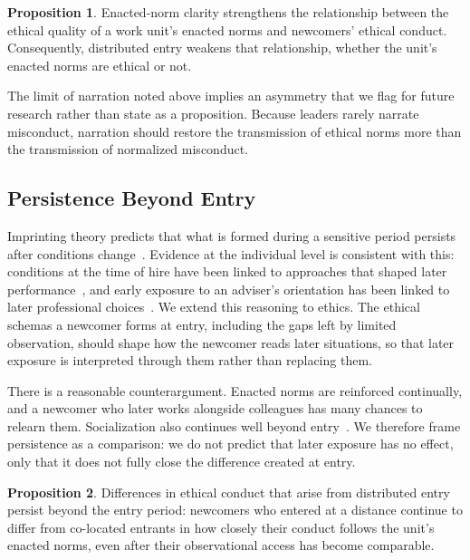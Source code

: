 \documentclass[12pt,a4paper]{article}
\theoremstyle{definition}
\newtheorem{proposition}{Proposition}
\begin{document}
\begin{proposition}
Enacted-norm clarity strengthens the relationship between the ethical quality of a work unit's enacted norms and newcomers' ethical conduct. Consequently, distributed entry weakens that relationship, whether the unit's enacted norms are ethical or not.
\end{proposition}

The limit of narration noted above implies an asymmetry that we flag for future research rather than state as a proposition. Because leaders rarely narrate misconduct, narration should restore the transmission of ethical norms more than the transmission of normalized misconduct.

\subsection{Persistence Beyond Entry}

Imprinting theory predicts that what is formed during a sensitive period persists after conditions change~\citep{marquis2013imprinting}. Evidence at the individual level is consistent with this: conditions at the time of hire have been linked to approaches that shaped later performance~\citep{tilcsik2014imprint}, and early exposure to an adviser's orientation has been linked to later professional choices~\citep{azoulay2017social}. We extend this reasoning to ethics. The ethical schemas a newcomer forms at entry, including the gaps left by limited observation, should shape how the newcomer reads later situations, so that later exposure is interpreted through them rather than replacing them.

There is a reasonable counterargument. Enacted norms are reinforced continually, and a newcomer who later works alongside colleagues has many chances to relearn them. Socialization also continues well beyond entry~\citep{vanmaanen1979toward}. We therefore frame persistence as a comparison: we do not predict that later exposure has no effect, only that it does not fully close the difference created at entry.

\begin{proposition}
Differences in ethical conduct that arise from distributed entry persist beyond the entry period: newcomers who entered at a distance continue to differ from co-located entrants in how closely their conduct follows the unit's enacted norms, even after their observational access has become comparable.
\end{proposition}
\end{document}
